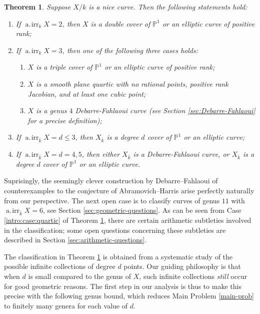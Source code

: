 \documentclass[11pt]{amsart}
\newcommand{\PP}{\mathbb{P}}
\newcommand{\kbar}{{\bar{k}}}
\newcommand{\airr}{\operatorname{a.\!irr}}
\newtheorem{theorem}{Theorem}[section]
\theoremstyle{definition}
\theoremstyle{remark}
\begin{document}
\begin{theorem}\label{main-low-degrees}
Suppose $X/k$ is a nice curve. Then the following statements hold:
\begin{enumerate}
    \item If $\airr_k X = 2$, then $X$ is a double cover of $\PP^1$ or an elliptic curve of positive rank;
    \item If $\airr_k X =3$, then one of the following three cases holds:
    \begin{enumerate}
        \item  $X$ is a triple cover of $\PP^1$ or an elliptic curve of positive rank;
        \item\label{intro:case:quartic} $X$ is a smooth plane quartic with no rational points, positive rank Jacobian, and at least one cubic point;
        \item $X$ is a genus $4$  Debarre-Fahlaoui curve  (see Section \ref{sec:Debarre-Fahlaoui} for a precise definition);
\end{enumerate}
    \item If $\airr_{\bar{k}} X =d\leqslant 3$, then $X_\kbar$ is a degree $d$ cover of $\PP^1$ or an elliptic curve; 
    \item If $\airr_{\bar{k}}X = d=4,5$, then either $X_\kbar$ is a Debarre-Fahlaoui curve, or $X_{\kbar}$ is a degree $d$ cover of $\PP^1$ or an elliptic curve.
\end{enumerate}
\end{theorem}

Suprisingly, the seemingly clever construction by Debarre--Fahlaoui of counterexamples to the conjecture of Abramovich--Harris arise perfectly naturally from our perspective.  The next open case is to classify curves of genus \(11\) with \(\airr_{\bar{k}} X = 6\), see Section \ref{sec:geometric-questions}. As can be seen from Case \ref{intro:case:quartic} of Theorem \ref{main-low-degrees}, there are certain arithmetic subtleties involved in the classification; some open questions concerning these subtleties are described in Section \ref{sec:arithmetic-questions}.

\medskip

The classification in Theorem \ref{main-low-degrees} is obtained from a systematic study of the possible infinite collections of degree \(d\) points.
Our guiding philosophy is that when \(d\) is small compared to the genus of \(X\), such infinite collections \emph{still} occur for good geometric reasons.  The first step in our analysis is thus to make this precise with the following genus bound, which reduces Main Problem \ref{main-prob} to finitely many genera for each value of \(d\).
\end{document}
